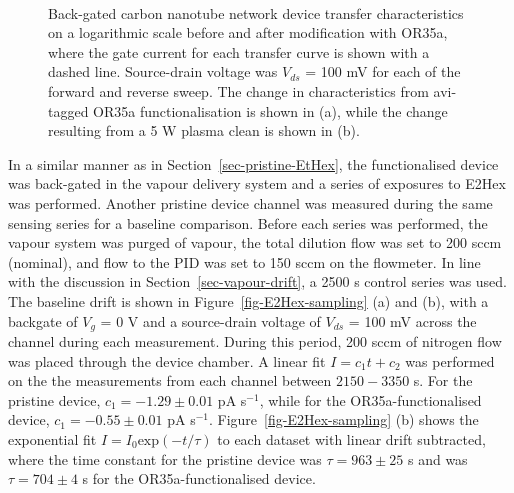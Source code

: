 \documentclass[
  a4paper,
]{scrbook}
\begin{document}
\begin{figure}
\begin{minipage}[t]{0.45\linewidth}
{{}

}

\end{minipage}%
%
\begin{minipage}[t]{0.01\linewidth}

{\centering 

~

}

\end{minipage}%

\caption[Back-gated carbon nanotube network device transfer
characteristics before and after modification with OR35a, compared to
the change resulting from a 5 W plasma
clean.]{\label{fig-OR35a-TX-comparison}Back-gated carbon nanotube
network device transfer characteristics on a logarithmic scale before
and after modification with OR35a, where the gate current for each
transfer curve is shown with a dashed line. Source-drain voltage was
\(V_{ds}\) = 100 mV for each of the forward and reverse sweep. The
change in characteristics from avi-tagged OR35a functionalisation is
shown in (a), while the change resulting from a 5 W plasma clean is
shown in (b).}

\end{figure}

In a similar manner as in Section~\ref{sec-pristine-EtHex}, the
functionalised device was back-gated in the vapour delivery system and a
series of exposures to E2Hex was performed. Another pristine device
channel was measured during the same sensing series for a baseline
comparison. Before each series was performed, the vapour system was
purged of vapour, the total dilution flow was set to 200 sccm (nominal),
and flow to the PID was set to 150 sccm on the flowmeter. In line with
the discussion in Section~\ref{sec-vapour-drift}, a 2500 s control
series was used. The baseline drift is shown in
Figure~\ref{fig-E2Hex-sampling} (a) and (b), with a backgate of \(V_g\)
= 0 V and a source-drain voltage of \(V_{ds}\) = 100 mV across the
channel during each measurement. During this period, 200 sccm of
nitrogen flow was placed through the device chamber. A linear fit
\(I = c_1t + c_2\) was performed on the the measurements from each
channel between \(2150-3350\) s. For the pristine device,
\(c_1 = -1.29 \pm 0.01\) pA s\(^{-1}\), while for the
OR35a-functionalised device, \(c_1 = -0.55 \pm 0.01\) pA s\(^{-1}\).
Figure~\ref{fig-E2Hex-sampling} (b) shows the exponential fit
\(I = I_0\textrm{exp}(-t/\tau)\) to each dataset with linear drift
subtracted, where the time constant for the pristine device was
\(\tau = 963 \pm 25\) s and was \(\tau = 704 \pm 4\) s for the
OR35a-functionalised device.
\end{document}
